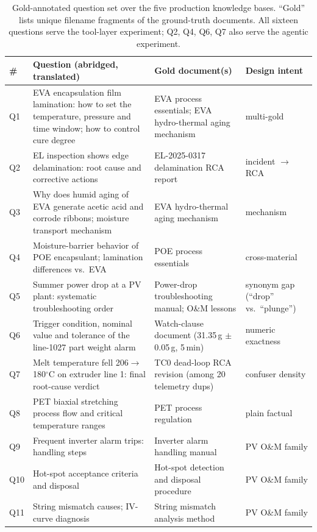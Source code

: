 \begin{table}[!htbp]
\centering
\scriptsize
\setlength{\tabcolsep}{3pt}
\caption{Gold-annotated question set over the five production knowledge
bases. ``Gold'' lists unique filename fragments of the ground-truth
documents. All sixteen questions serve the tool-layer experiment; Q2, Q4, Q6, Q7 also
serve the agentic experiment.}
\label{tab:questions}
\begin{tabular}{lp{5.3cm}p{4.0cm}p{2.8cm}}
\toprule
\# & Question (abridged, translated) & Gold document(s) & Design intent \\
\midrule
Q1 & EVA encapsulation film lamination: how to set the temperature, pressure
and time window; how to control cure degree & EVA process essentials; EVA
hydro-thermal aging mechanism & multi-gold \\
Q2 & EL inspection shows edge delamination: root cause and corrective
actions & EL-2025-0317 delamination RCA report & incident $\to$ RCA \\
Q3 & Why does humid aging of EVA generate acetic acid and corrode ribbons;
moisture transport mechanism & EVA hydro-thermal aging mechanism & mechanism \\
Q4 & Moisture-barrier behavior of POE encapsulant; lamination differences
vs.\ EVA & POE process essentials & cross-material \\
Q5 & Summer power drop at a PV plant: systematic troubleshooting order &
Power-drop troubleshooting manual; O\&M lessons & synonym gap
(``drop'' vs.\ ``plunge'') \\
Q6 & Trigger condition, nominal value and tolerance of the line-1027 part
weight alarm & Watch-clause document (31.35\,g $\pm$0.05\,g, 5\,min) &
numeric exactness \\
Q7 & Melt temperature fell 206$\to$180$^\circ$C on extruder line 1: final
root-cause verdict & TC0 dead-loop RCA revision (among 20 telemetry dups) &
confuser density \\
Q8 & PET biaxial stretching process flow and critical temperature ranges &
PET process regulation & plain factual \\
Q9 & Frequent inverter alarm trips: handling steps & Inverter alarm handling
manual & PV O\&M family \\
Q10 & Hot-spot acceptance criteria and disposal & Hot-spot detection and
disposal procedure & PV O\&M family \\
Q11 & String mismatch causes; IV-curve diagnosis & String mismatch analysis
method & PV O\&M family \\

\end{tabular}
\end{table}
